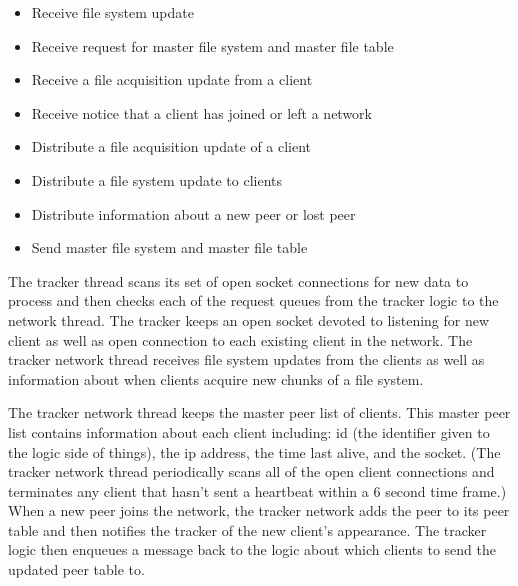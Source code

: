 
\begin{itemize}
	\item Receive file system update
	\item Receive request for master file system and master file table
	\item Receive a file acquisition update from a client
	\item Receive notice that a client has joined or left a network
\end{itemize}

\begin{itemize}
	\item Distribute a file acquisition update of a client
	\item Distribute a file system update to clients
	\item Distribute information about a new peer or lost peer
	\item Send master file system and master file table
\end{itemize}

The tracker thread scans its set of open socket connections for new data to process and then checks each of the request queues from the tracker logic to the network thread. The tracker keeps an open socket devoted to listening for new client as well as open connection to each existing client in the network. The tracker network thread receives file system updates from the clients as well as information about when clients acquire new chunks of a file system. 

The tracker network thread keeps the master peer list of clients. This master peer list contains information about each client including: id (the identifier given to the logic side of things), the ip address, the time last alive, and the socket. (The tracker network thread periodically scans all of the open client connections and terminates any client that hasn't sent a heartbeat within a 6 second time frame.) When a new peer joins the network, the tracker network adds the peer to its peer table and then notifies the tracker of the new client's appearance. The tracker logic then enqueues a message back to the logic about which clients to send the updated peer table to. 
